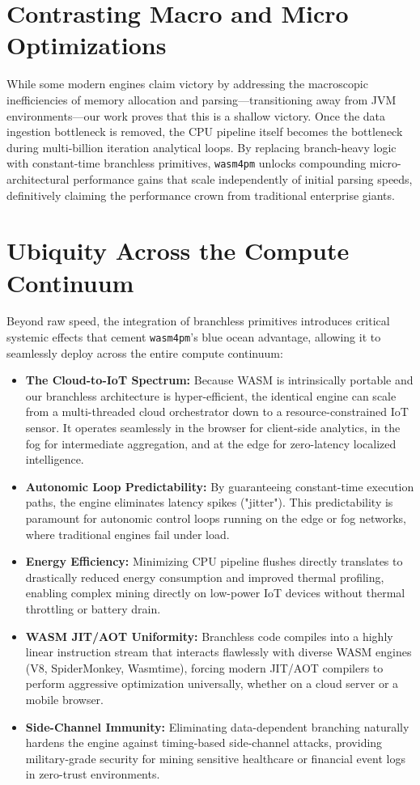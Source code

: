 \documentclass[12pt,a4paper]{report}
\begin{document}
\section{Contrasting Macro and Micro Optimizations}
While some modern engines claim victory by addressing the macroscopic inefficiencies of memory allocation and parsing—transitioning away from  JVM environments—our work proves that this is a shallow victory. Once the data ingestion bottleneck is removed, the CPU pipeline itself becomes the bottleneck during multi-billion iteration analytical loops. By replacing branch-heavy logic with constant-time branchless primitives, \texttt{wasm4pm} unlocks compounding micro-architectural performance gains that scale independently of initial parsing speeds, definitively claiming the performance crown from traditional enterprise giants.

\section{Ubiquity Across the Compute Continuum}
Beyond raw speed, the integration of branchless primitives introduces critical systemic effects that cement \texttt{wasm4pm}'s blue ocean advantage, allowing it to seamlessly deploy across the entire compute continuum:

\begin{itemize}
    \item \textbf{The Cloud-to-IoT Spectrum:} Because WASM is intrinsically portable and our branchless architecture is hyper-efficient, the identical engine can scale from a multi-threaded cloud orchestrator down to a resource-constrained IoT sensor. It operates seamlessly in the browser for client-side analytics, in the fog for intermediate aggregation, and at the edge for zero-latency localized intelligence.
    \item \textbf{Autonomic Loop Predictability:} By guaranteeing constant-time execution paths, the engine eliminates latency spikes ("jitter"). This predictability is paramount for autonomic control loops running on the edge or fog networks, where traditional engines fail under load.
    \item \textbf{Energy Efficiency:} Minimizing CPU pipeline flushes directly translates to drastically reduced energy consumption and improved thermal profiling, enabling complex mining directly on low-power IoT devices without thermal throttling or battery drain.
    \item \textbf{WASM JIT/AOT Uniformity:} Branchless code compiles into a highly linear instruction stream that interacts flawlessly with diverse WASM engines (V8, SpiderMonkey, Wasmtime), forcing modern JIT/AOT compilers to perform aggressive optimization universally, whether on a cloud server or a mobile browser.
    \item \textbf{Side-Channel Immunity:} Eliminating data-dependent branching naturally hardens the engine against timing-based side-channel attacks, providing military-grade security for mining sensitive healthcare or financial event logs in zero-trust environments.
\end{itemize}
\end{document}
